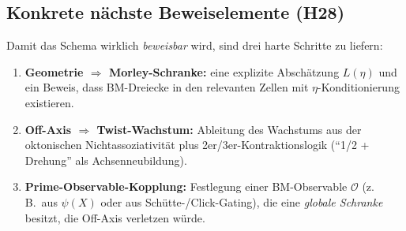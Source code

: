 \subsection{Konkrete n\"achste Beweiselemente (H28)}
Damit das Schema wirklich \emph{beweisbar} wird, sind drei harte Schritte zu liefern:
\begin{enumerate}
\item \textbf{Geometrie $\Rightarrow$ Morley-Schranke:} eine explizite Absch\"atzung $L(\eta)$ und ein Beweis, dass BM-Dreiecke
in den relevanten Zellen mit $\eta$-Konditionierung existieren.
\item \textbf{Off-Axis $\Rightarrow$ Twist-Wachstum:} Ableitung des Wachstums aus der oktonischen Nichtassoziativit\"at plus
2er/3er-Kontraktionslogik (``1/2 + Drehung'' als Achsenneubildung).
\item \textbf{Prime-Observable-Kopplung:} Festlegung einer BM-Observable $\mathcal O$ (z.\,B.\ aus $\psi(X)$ oder aus
Sch\"utte-/Click-Gating), die eine \emph{globale Schranke} besitzt, die Off-Axis verletzen w\"urde.
\end{enumerate}
